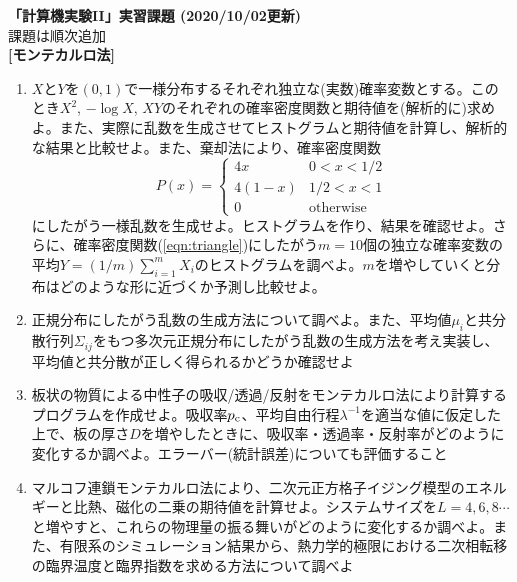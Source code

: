 \documentclass[11pt]{jarticle}
\begin{document}
\noindent
{\bf\large 「計算機実験II」実習課題 (2020/10/02更新)}
\\[-0.5em]

\noindent
課題は順次追加\\[-0.5em]


{\bf [モンテカルロ法]}
\begin{enumerate}

\item $X$と$Y$を$(0,1)$で一様分布するそれぞれ独立な(実数)確率変数とする。このとき$X^2$, $-\log X$, $XY$のそれぞれの確率密度関数と期待値を(解析的に)求めよ。また、実際に乱数を生成させてヒストグラムと期待値を計算し、解析的な結果と比較せよ。また、棄却法により、確率密度関数
  \begin{equation}
    P(x) = \begin{cases} 4x & 0 < x < 1/2 \\
      4(1-x) & 1/2 < x < 1 \\
      0 & \text{otherwise}
    \end{cases}
    \label{eqn:triangle}
  \end{equation}
  にしたがう一様乱数を生成せよ。ヒストグラムを作り、結果を確認せよ。さらに、確率密度関数(\ref{eqn:triangle})にしたがう$m=10$個の独立な確率変数の平均$Y=(1/m) \sum_{i=1}^m X_i$のヒストグラムを調べよ。$m$を増やしていくと分布はどのような形に近づくか予測し比較せよ。
  
\item 正規分布にしたがう乱数の生成方法について調べよ。また、平均値$\mu_i$と共分散行列$\Sigma_{ij}$をもつ多次元正規分布にしたがう乱数の生成方法を考え実装し、平均値と共分散が正しく得られるかどうか確認せよ

\item 板状の物質による中性子の吸収/透過/反射をモンテカルロ法により計算するプログラムを作成せよ。吸収率$p_{\rm c}$、平均自由行程$\lambda^{-1}$を適当な値に仮定した上で、板の厚さ$D$を増やしたときに、吸収率・透過率・反射率がどのように変化するか調べよ。エラーバー(統計誤差)についても評価すること

\item マルコフ連鎖モンテカルロ法により、二次元正方格子イジング模型のエネルギーと比熱、磁化の二乗の期待値を計算せよ。システムサイズを$L=4, 6,8\cdots$と増やすと、これらの物理量の振る舞いがどのように変化するか調べよ。また、有限系のシミュレーション結果から、熱力学的極限における二次相転移の臨界温度と臨界指数を求める方法について調べよ


\end{enumerate}
\end{document}

